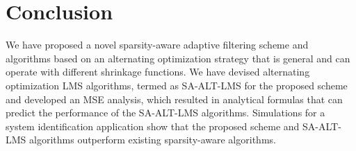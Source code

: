 \documentclass[10pt,onecolumn]{IEEEtran}
\begin{document}
\section{Conclusion}

We have proposed a novel sparsity-aware adaptive filtering
scheme and algorithms based on an alternating optimization strategy
that is general and can operate with different shrinkage functions.
We have devised alternating optimization LMS
algorithms, termed as SA-ALT-LMS for the proposed scheme and
developed an MSE analysis, which resulted in analytical formulas
that can predict the performance of the SA-ALT-LMS algorithms.
Simulations for a system identification application
show that the proposed scheme and SA-ALT-LMS algorithms outperform
existing sparsity-aware algorithms.

\newpage
\end{document}
